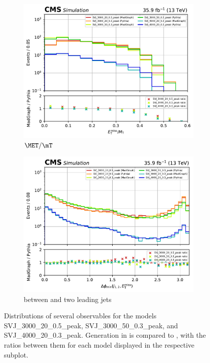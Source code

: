 \begin{figure}[htbp]
    \begin{subfigure}[b]{0.45\textwidth}
        \includegraphics[width=\textwidth]{figures/madgraph_pythia_comparisons/with_ratios/part2/met_over_mt.pdf}
        \caption{$\MET/\mT$}
    \end{subfigure}
    \hfill
    \begin{subfigure}[b]{0.45\textwidth}
        \includegraphics[width=\textwidth]{figures/madgraph_pythia_comparisons/with_ratios/part2/min_dphi.pdf}
        \caption{\mindphi between \MET and two leading \glspl{jet}}
    \end{subfigure}
    \caption[Distributions of several observables for the models SVJ\_3000\_20\_0.5\_peak, SVJ\_3000\_50\_0.3\_peak, and SVJ\_4000\_20\_0.3\_peak]{Distributions of several observables for the models SVJ\_3000\_20\_0.5\_peak, SVJ\_3000\_50\_0.3\_peak, and SVJ\_4000\_20\_0.3\_peak. Generation in \MGvATNLO is compared to \PYTHIAEIGHT, with the ratios between them for each model displayed in the respective subplot.}
    \label{fig:svj_mg_pythia_comparison_set2}
\end{figure}

